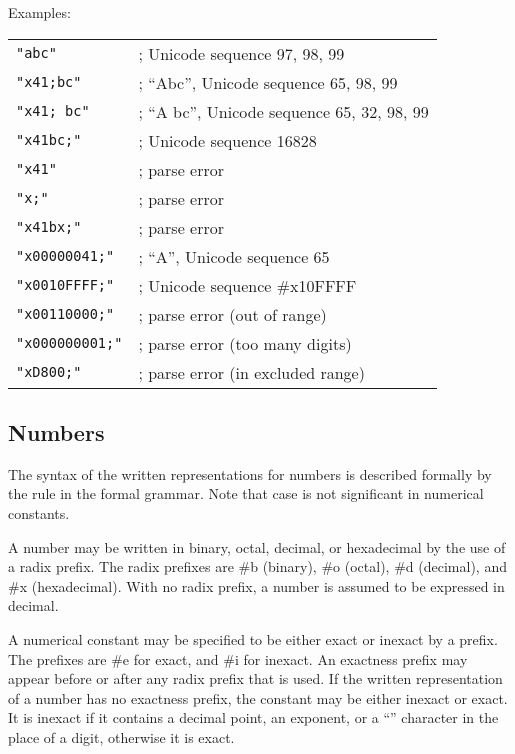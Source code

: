 Examples:

\begin{center}
  \begin{tabular}{ll}
    {\tt "abc"}    & ; Unicode sequence 97, 98, 99\\
    {\tt "\backwhack{}x41;bc"} & ; ``Abc'', Unicode sequence 65, 98, 99\\
    {\tt "\backwhack{}x41; bc"} & ; ``A bc'', Unicode sequence 65, 32, 98, 99\\
    {\tt "\backwhack{}x41bc;"} & ; Unicode sequence 16828\\
    {\tt "\backwhack{}x41"} & ; parse error\\
    {\tt "\backwhack{}x;"} & ; parse error\\
    {\tt "\backwhack{}x41bx;"} & ; parse error\\
    {\tt "\backwhack{}x00000041;"} & ; ``A'', Unicode sequence 65\\
    {\tt "\backwhack{}x0010FFFF;"} &  ; Unicode sequence \#x10FFFF\\
    {\tt "\backwhack{}x00110000;"}&  ; parse error (out of range)\\
    {\tt "\backwhack{}x000000001;"}& ; parse error (too many digits)\\
    {\tt "\backwhack{}xD800;"}&      ; parse error (in excluded range)
  \end{tabular}
\end{center}

\subsection{Numbers}
\label{numbernotations}

The syntax of the written representations for numbers is described
formally by the  rule in the formal grammar.  Note that
case is not significant in numerical constants.

A number may be written in binary, octal, decimal, or
hexadecimal by the use of a radix prefix.  The radix prefixes are {\cf
\#b} (binary), {\cf \#o} (octal), {\cf
\#d} (decimal), and {\cf \#x} (hexadecimal).  With
no radix prefix, a number is assumed to be expressed in decimal.

A
numerical constant may be specified to be either exact or
inexact by a prefix.  The prefixes are {\cf \#e}
for exact, and {\cf \#i} for inexact.  An exactness
prefix may appear before or after any radix prefix that is used.  If
the written representation of a number has no exactness prefix, the
constant may be either inexact or exact.  It is
inexact if it contains a decimal point, an
exponent, or a ``\sharpsign'' character in the place of a digit,
otherwise it is exact.

